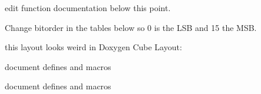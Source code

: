 
\begin{DoxyRefList}
\item[\label{todo__todo000006}%
\hypertarget{todo__todo000006}{}%
global\+Scope$>$ Member \hyperlink{_led_cube_8c_a6e1bec5e1376511c7b79d3f217af65a8}{\+\_\+helper\+Print\+Byte} (const uint8\+\_\+t \+\_\+b)]edit function documentation below this point.  
\item[\label{todo__todo000005}%
\hypertarget{todo__todo000005}{}%
global\+Scope$>$ Member \hyperlink{_led_driver_8h_a3ed82ed3cce7de15bc8e7675c776e1d9}{\+\_\+\+L\+E\+D\+\_\+\+D\+R\+I\+V\+E\+R\+\_\+\+Reorder\+Led\+Data} (led\+Data)]Change bitorder in the tables below so 0 is the L\+S\+B and 15 the M\+S\+B.  
\item[\label{todo__todo000001}%
\hypertarget{todo__todo000001}{}%
global\+Scope$>$ Member \hyperlink{_layer_control_8h_a816c836589db27dcd3632fade8f0f6f3}{L\+C\+\_\+\+E\+N\+A\+B\+L\+E\+\_\+\+S\+E\+L\+F\+\_\+\+T\+E\+S\+T\+\_\+\+N\+O} ]this layout looks weird in Doxygen Cube Layout\+: 
\item[\label{todo__todo000002}%
\hypertarget{todo__todo000002}{}%
global\+Scope$>$ Member \hyperlink{_layer_control_8h_a06153a40508dfb2456f40e344e145c08}{N\+\_\+\+P\+A\+N\+E\+L\+C\+O\+N\+T\+R\+O\+L\+S} ]document defines and macros  
\item[\label{todo__todo000004}%
\hypertarget{todo__todo000004}{}%
global\+Scope$>$ Member \hyperlink{_led_driver_8h_a97476fd466a0045342316c7a2a0c6ccb}{S\+P\+I1\+\_\+\+P\+P\+R\+E} ]document defines and macros 
\end{DoxyRefList}
